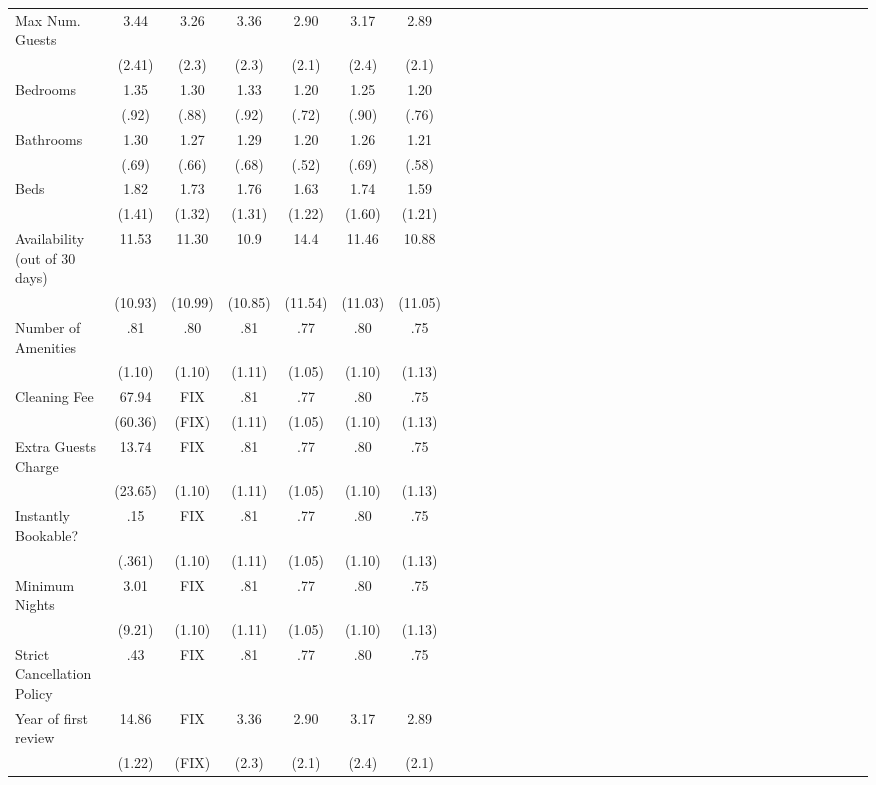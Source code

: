 {\begin{longtable}{l*{6}{c|c|cccc}}
Max Num. Guests   & 3.44   &      3.26	&      3.36  &      2.90		&    3.17 		&	 2.89\\
               & (2.41)    &     (2.3)         &     (2.3)         &     (2.1)         &     (2.4)         & (2.1)\\
Bedrooms    &  1.35 &      1.30 &      1.33         &      1.20         &      1.25   & 1.20      \\
              &   (.92)   &     (.88)         &     (.92)         &     (.72)         &     (.90)       & (.76)  \\
Bathrooms  & 1.30  &      1.27         &       1.29         &      1.20         &      1.26 & 1.21         \\
                &  (.69)  &     (.66)         &     (.68)         &     (.52)         &     (.69)         & (.58)\\
Beds       & 1.82  &      1.73 &      1.76         &      1.63         &      1.74         & 1.59\\
               &   (1.41)  &     (1.32)         &     (1.31)         &     (1.22)         &     (1.60)   & (1.21)      \\
Availability (out of 30 days)    & 11.53   &      11.30&      10.9&      14.4 &      11.46  	& 	10.88\\
         &  (10.93)    & (10.99)     &     (10.85)  &     (11.54)  &     (11.03)         &     (11.05)         \\
Number of Amenities   &   .81  &      .80		&      .81&      .77 &      .80  	& 	.75\\
         						  &  (1.10)  & (1.10)     &     (1.11)    &     (1.05)         &     (1.10)         &     (1.13)         \\
Cleaning Fee   &  67.94 &      FIX	&      .81&      .77 &      .80  	& 	.75\\
						&  (60.36)  & (FIX)     &     (1.11)         &     (1.05)         &     (1.10)     &     (1.13)         \\
Extra Guests Charge   &   13.74  &  FIX      &    .81  &      .77           &   .80  	& 	.75\\
									&  (23.65)  & (1.10)  &     (1.11) &     (1.05)     &     (1.10) &     (1.13)  \\
Instantly Bookable?   &   .15  &      FIX		&      .81&      .77 &      .80  	& 	.75\\
									&  (.361)  & (1.10)     &     (1.11)  &     (1.05)   &     (1.10)   &     (1.13)         \\
Minimum Nights   &   3.01  &      FIX		&      .81&      .77 &      .80  	& 	.75\\
							&  (9.21)  & (1.10)     &     (1.11)         &     (1.05)         &     (1.10)         &     (1.13)         \\
Strict Cancellation Policy   &   .43  &      FIX		&      .81&      .77 &      .80  	& 	.75\\
[1em]
Year of first review    & 14.86   &      FIX	&      3.36  &      2.90		&    3.17 		&	 2.89\\
							& (1.22)    &     (FIX)         &     (2.3)         &     (2.1)         &     (2.4)         & (2.1)\\


\end{longtable}}
